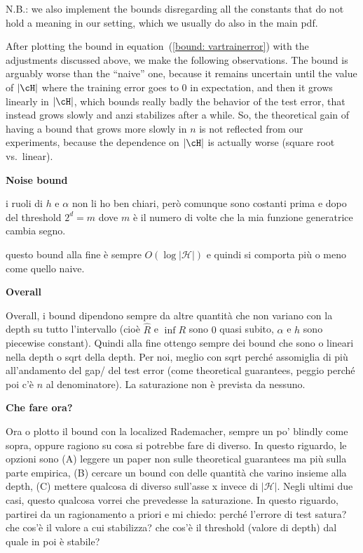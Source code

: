 N.B.: we also implement the bounds disregarding all the constants that do not hold a meaning in our setting, which we usually do also in the main pdf. 

After plotting the bound in equation~(\ref{bound: vartrainerror}) with the adjustments discussed above, we make the following observations. The bound is arguably worse than the ``naive'' one, because it remains uncertain until the value of $\vert\cH\vert$ where the training error goes to 0 in expectation, and then it grows linearly in $\vert\cH\vert$, which bounds really badly the behavior of the test error, that instead grows slowly and anzi stabilizes after a while. So, the theoretical gain of having a bound that grows more slowly in $n$ is not reflected from our experiments, because the dependence on $\vert \cH\vert$ is actually worse (square root vs.\ linear). 

{\bf Noise bound}

i ruoli di $h$ e $\alpha$ non li ho ben chiari, però comunque sono costanti prima e dopo del threshold $2^d = m$ dove $m$ è il numero di volte che la mia funzione generatrice cambia segno. 

questo bound alla fine è sempre $O(\log \vert\mathcal H\vert)$ e quindi si comporta più o meno come quello naive. 

{\bf Overall}

Overall, i bound dipendono sempre da altre quantità che non variano con la depth su tutto l'intervallo (cioè $\hat R$ e $\inf R$ sono $0$ quasi subito, $\alpha$ e $h$ sono piecewise constant). Quindi alla fine ottengo sempre dei bound che sono o lineari nella depth o sqrt della depth. Per noi, meglio con sqrt perché assomiglia di più all'andamento del gap/ del test error (come theoretical guarantees, peggio perché poi c'è $n$ al denominatore). La saturazione non è prevista da nessuno. 

{\bf Che fare ora?}

Ora o plotto il bound con la localized Rademacher, sempre un po' blindly come sopra, oppure ragiono su cosa si potrebbe fare di diverso. In questo riguardo, le opzioni sono (A) leggere un paper non sulle theoretical guarantees ma più sulla parte empirica, (B) cercare un bound con delle quantità che varino insieme alla depth, (C) mettere qualcosa di diverso sull'asse x invece di $\vert \mathcal H \vert$. Negli ultimi due casi, questo qualcosa vorrei che prevedesse la saturazione. In questo riguardo, partirei da un ragionamento a priori e mi chiedo: perché l'errore di test satura? che cos'è il valore a cui stabilizza? che cos'è il threshold (valore di depth) dal quale in poi è stabile?

